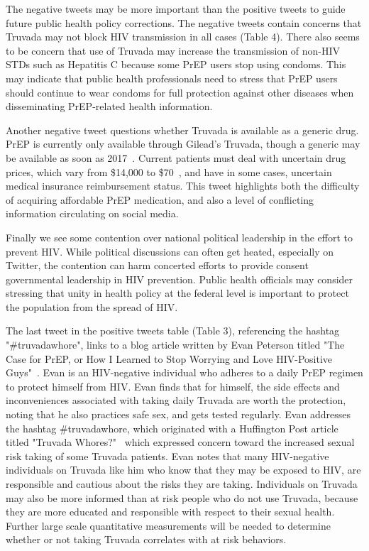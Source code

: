 \documentclass{sig-alternate-05-2015}
\begin{document}
The negative tweets may be more important than the positive tweets to guide future public health policy corrections. The negative tweets contain concerns that Truvada may not block HIV transmission in all cases (Table 4). There also seems to be concern that use of Truvada may increase the transmission of non-HIV STDs such as Hepatitis C because some PrEP users stop using condoms. This may indicate that public health professionals need to stress that PrEP users should continue to wear condoms for full protection against other diseases when disseminating PrEP-related health information.

Another negative tweet questions whether Truvada is available as a generic drug. PrEP is currently only available through Gilead's Truvada, though a generic may be available as soon as 2017~\cite{truvadagenericblog}. Current patients must deal with uncertain drug prices, which vary from \$14,000 to \$70~\cite{truvadagenericblog}, and have in some cases, uncertain medical insurance reimbursement status. This tweet highlights both the difficulty of acquiring affordable PrEP medication, and also a level of conflicting information circulating on social media.

Finally we see some contention over national political leadership in the effort to prevent HIV. While political discussions can often get heated, especially on Twitter, the contention can harm concerted efforts to provide consent governmental leadership in HIV prevention. Public health officials may consider stressing that unity in health policy at the federal level is important to protect the population from the spread of HIV.

The last tweet in the positive tweets table (Table 3), referencing the hashtag "\#truvadawhore", links to a blog article written by Evan Peterson titled "The Case for PrEP, or How I Learned to Stop Worrying and Love HIV-Positive Guys"~\cite{caseforprep}. Evan is an HIV-negative individual who adheres to a daily PrEP regimen to protect himself from HIV. Evan finds that for himself, the side effects and inconveniences associated with taking daily Truvada are worth the protection, noting that he also practices safe sex, and gets tested regularly. Evan addresses the hashtag \#truvadawhore, which originated with a Huffington Post article titled "Truvada Whores?"~\cite{truvadawhore} which expressed concern toward the increased sexual risk taking of some Truvada patients. Evan notes that many HIV-negative individuals on Truvada like him who know that they may be exposed to HIV, are responsible and cautious about the risks they are taking. Individuals on Truvada may also be more informed than at risk people who do not use Truvada, because they are more educated and responsible with respect to their sexual health. Further large scale quantitative measurements will be needed to determine whether or not taking Truvada correlates with at risk behaviors.
\end{document}
